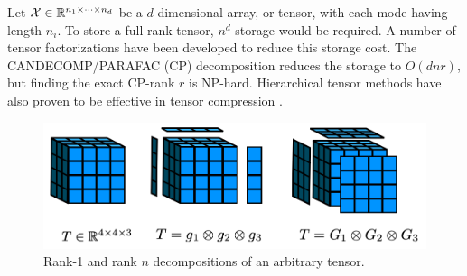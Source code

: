 Let $\mathcal{X} \in \mathbb{R}^{n_1 \times \cdots \times n_d}$ be a $d$-dimensional array, or tensor, with each mode having length $n_i$. To store a full rank tensor, $n^d$ storage would be required. A number of tensor factorizations have been developed to reduce this storage cost. The CANDECOMP/PARAFAC (CP) decomposition \citep{harshman1970foundations,carroll1970analysis} reduces the storage to $O(dnr)$, but finding the exact CP-rank $r$ is NP-hard. Hierarchical tensor methods have also proven to be effective in tensor compression \citep{cohen2016expressive, cohen2016convolutional}.
\begin{figure}
	\includegraphics[width=\textwidth]{2_bknd/tensor_decomps.png}
	\caption[CP tensor decomposition]{\label{fig:cp_decomp} Rank-1 and rank $n$ decompositions of an arbitrary tensor.}
\end{figure}

